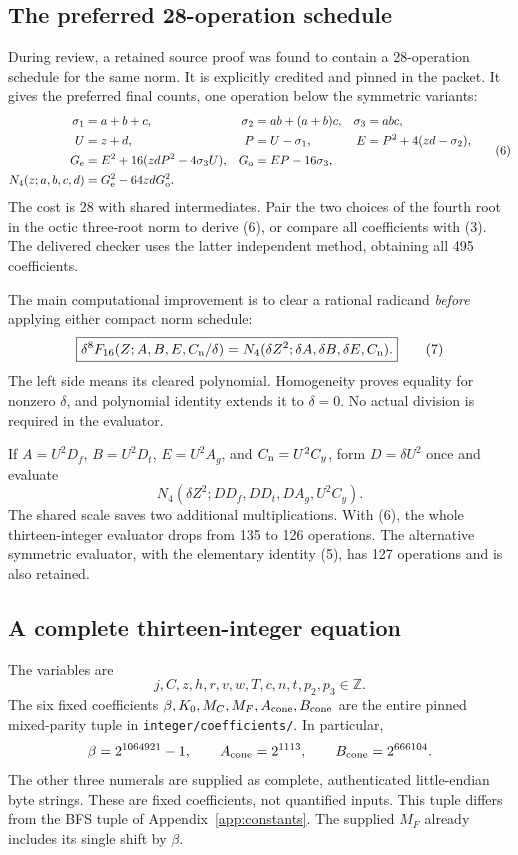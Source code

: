 \documentclass[11pt]{article}
\theoremstyle{remark}
\newcommand{\Z}{\mathbb Z}
\begin{document}
\subsection{The preferred 28-operation schedule}

During review, a retained source proof was found to contain a 28-operation
schedule for the same norm. It is explicitly credited and pinned in the
packet. It gives the preferred final counts, one operation below the
symmetric variants:
\[
\begin{aligned}
\sigma_1&=a+b+c,&\sigma_2&=ab+(a+b)c,&\sigma_3&=abc,\\
U&=z+d,&P&=U-\sigma_1,&
E&=P^2+4(zd-\sigma_2),\\
G_{\rm e}&=E^2+16(zdP^2-4\sigma_3U),&
G_{\rm o}&=EP-16\sigma_3,\\
N_4(z;a,b,c,d)&=G_{\rm e}^2-64zdG_{\rm o}^2.
\end{aligned}
\tag{6}
\]
The cost is 28 with shared intermediates. Pair the two choices of the
fourth root in the octic three-root norm to derive (6), or compare all
coefficients with (3). The delivered checker uses the latter independent
method, obtaining all 495 coefficients.

The main computational improvement is to clear a rational radicand
\emph{before} applying either compact norm schedule:
\[
\boxed{
\delta^8F_{16}(Z;A,B,E,C_{\rm n}/\delta)
=N_4(\delta Z^2;\delta A,\delta B,\delta E,C_{\rm n}).
}
\tag{7}
\]
The left side means its cleared polynomial. Homogeneity proves equality
for nonzero $\delta$, and polynomial identity extends it to $\delta=0$.
No actual division is required in the evaluator.

If $A=U^2D_f$, $B=U^2D_t$, $E=U^2A_g$, and $C_{\rm n}=U^2C_y$,
form $D=\delta U^2$ once and evaluate
\[
N_4(\delta Z^2;DD_f,DD_t,DA_g,U^2C_y).
\tag{8}
\]
The shared scale saves two additional multiplications. With (6), the
whole thirteen-integer evaluator drops from 135 to 126 operations.
The alternative symmetric evaluator, with the elementary identity (5),
has 127 operations and is also retained.

\subsection{A complete thirteen-integer equation}

The variables are
\[
j,C,z,h,r,v,w,T,c,n,t,p_2,p_3\in\Z.
\tag{9}
\]
The six fixed coefficients
$\beta,K_0,M_C,M_F,A_{\rm cone},B_{\rm cone}$ are the entire pinned
mixed-parity tuple in \texttt{integer/coefficients/}. In particular,
\[
\beta=2^{1064921}-1,\qquad A_{\rm cone}=2^{1113},\qquad
B_{\rm cone}=2^{666104}.
\]
The other three numerals are supplied as complete, authenticated
little-endian byte strings. These are fixed coefficients, not quantified
inputs. This tuple differs from the BFS tuple of Appendix~\ref{app:constants}.
The supplied $M_F$ already includes its single shift by $\beta$.
\end{document}
